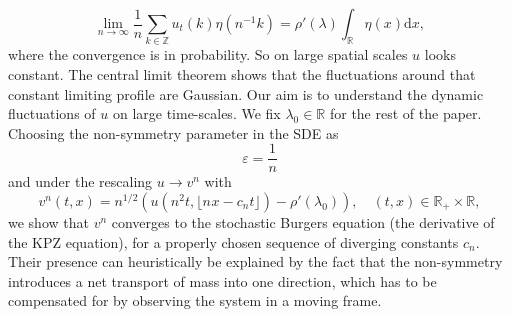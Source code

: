 \documentclass[11pt, a4paper]{article}
\newcommand{\mathd}{\mathrm{d}}
\newcommand{\R}{\mathbb{R}}
\newcommand{\1}{\mathbf{1}}
\newcommand{\Z}{\mathbb{Z}}
\begin{document}
\[
   \lim_{n \to \infty} \frac{1}{n} \sum_{k \in \Z} u_t ( k) \eta(n^{-1} k) = \rho'(\lambda) \int_\R \eta(x) \mathd x,
\]
where the convergence is in probability. So on large spatial scales $u$ looks constant. The central limit theorem shows that the fluctuations around that constant limiting profile are Gaussian. Our aim is to understand the dynamic fluctuations of $u$ on large time-scales. We fix $\lambda_0 \in \mathbb{R}$ for the rest of the paper.
Choosing the non-symmetry parameter in the SDE as
\[
   \varepsilon = \frac{1}{n}
\]
and under the rescaling $u \rightarrow v^n$ with
\[
   v^n (t, x) = n^{1 / 2} (u (n^2 t, \lfloor n^{} x  - c_n t \rfloor) - \rho'(\lambda_0)), \quad (t,x) \in \R_+ \times \R,
\]
we show that $v^n$ converges to the stochastic Burgers equation (the derivative of the KPZ equation), for a
properly chosen sequence of diverging constants $c_n$. Their presence can heuristically be explained by the fact that
the non-symmetry introduces a net transport of mass into one
direction, which has to be compensated for by observing the system in a moving frame.
\end{document}
